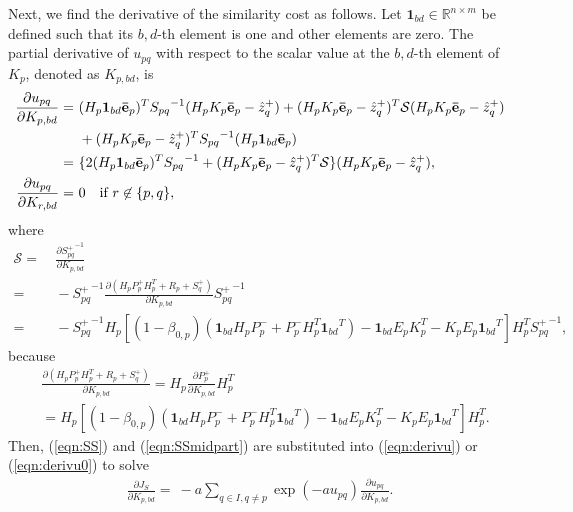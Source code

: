 \documentclass[letterpaper, paper,10pt]{AAS}		%
\newcommand{\refeqn}[1]{(\ref{eqn:#1})}
\newcommand{\deriv}[2]{\ensuremath{\frac{\partial #1}{\partial #2}}}
\renewcommand{\Re}{\ensuremath{\mathbb{R}}}
\newcommand{\Ibd}{\ensuremath{\mathbf{1}_{bd}}}
\begin{document}
Next, we find the derivative of the similarity cost as follows.
Let $\Ibd\in \Re^{n\times m}$ be defined such that its $b,d$-th element is one and other elements are zero.
The partial derivative of $u_{pq}$ with respect to the scalar value at the $b,d$-th element of $K_p$, denoted as $K_{p,bd}$, is
\begin{align}
\deriv{u_{pq}}{K_{p,bd}}
=&\ 
(H_p\Ibd{\bf\bar e}_p)^T
{S_{pq}}^{-1}
(H_pK_p{\bf\bar e}_p-\hat z^+_{q})+
(H_pK_p{\bf\bar e}_p-\hat z^+_{q})^T
\mathcal{S}
(H_pK_p{\bf\bar e}_p-\hat z^+_{q})\nonumber
\\
&\ +
(H_pK_p{\bf\bar e}_p-\hat z^+_{q})^T
{S_{pq}}^{-1}
(H_p\Ibd{\bf\bar e}_p)\nonumber
\\
=&\ \{
2(H_p\Ibd{\bf\bar e}_p)^T
{S_{pq}}^{-1} +(H_pK_p{\bf\bar e}_p-\hat z^+_{q})^T
\mathcal{S}
\}(H_pK_p{\bf\bar e}_p-\hat z^+_{q}),\label{eqn:derivu}
\\
\deriv{u_{pq}}{K_{r,bd}}=&\ 0\quad \mbox{if } r\not\in\{p,q\},\label{eqn:derivu0}
\end{align}
where
\begin{align}
\mathcal{S}=&\ \deriv{{S^+_{pq}}^{-1}}{K_{p,bd}}\nonumber
\\
=&\ -{S^+_{pq}}^{-1}
\deriv{\left(H_pP^+_{p}H_p^T+R_p+S^+_q\right)}{K_{p,bd}}
{S^+_{pq}}^{-1}\nonumber
\\
=&\ -{S^+_{pq}}^{-1}
H_p
[(1-\beta_{0,p})(\Ibd H_pP_p^-+P_p^-H_p^T\Ibd^T)-\Ibd E_pK_p^T -K_pE_p\Ibd^T]
H_p^T
{S^+_{pq}}^{-1},\label{eqn:SS}
\end{align}
because
\begin{align}
&\deriv{\left(H_pP^+_{p}H_p^T+R_p+S^+_q\right)}{K_{p,bd}}
=
H_p
\deriv{P^+_{p}}{K_{p,bd}}
H_p^T\nonumber
\\
&=
H_p
[(1-\beta_{0,p})(\Ibd H_pP_p^-+P_p^-H_p^T\Ibd^T)-\Ibd E_pK_p^T -K_pE_p\Ibd^T]
H_p^T.\label{eqn:SSmidpart}
\end{align}
Then, \refeqn{SS} and \refeqn{SSmidpart} are substituted into \refeqn{derivu} or \refeqn{derivu0} to solve
\begin{align}
\label{eqn:JSK}
\deriv{J_S}{K_{p,bd}}=\ -a\sum\limits_{q\in I,q\neq p}\exp (-au_{pq})\deriv{u_{pq}}{K_{p,bd}}.
\end{align}
\end{document}
